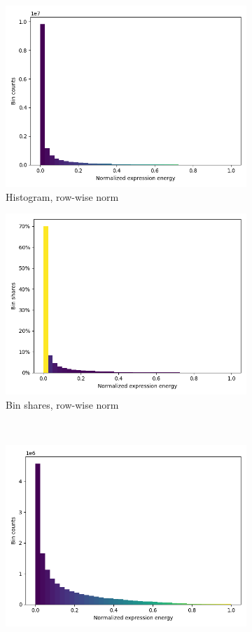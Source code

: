 \documentclass[]{article}
\begin{document}
\begin{figure}
\begin{subfigure}{.45\textwidth}
		\includegraphics[width=.9\linewidth]{plotted_figures/row_normal_ge_data_histo.png}
		\caption{Histogram, row-wise norm}
		\label{fig:row_hist}
	\end{subfigure}
	\begin{subfigure}{.45\textwidth}
		\centering
		\includegraphics[width=.9\linewidth]{plotted_figures/row_percent_ge_data_histo.png}
		\caption{Bin shares, row-wise norm}
		\label{fig:row_perc}
	\end{subfigure}\\
	\begin{subfigure}{.45\textwidth}
		\centering
		\includegraphics[width=.9\linewidth]{plotted_figures/column_normal_ge_data_histo.png}

\end{subfigure}
\end{figure}
\end{document}
